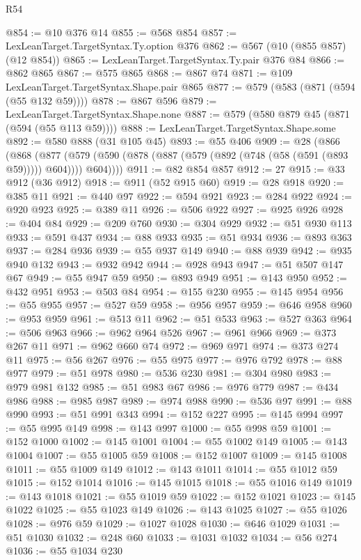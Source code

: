 \begin{lexlean}{R54}
\begin{coremodule}
@854 := @10 @376 @14
@855 := @568 @854
@857 := LexLeanTarget.TargetSyntax.Ty.option @376
@862 := @567 (@10 (@855 @857) (@12 @854))
@865 := LexLeanTarget.TargetSyntax.Ty.pair @376 @84
@866 := @862 @865
@867 := @575 @865
@868 := @867 @74
@871 := @109 LexLeanTarget.TargetSyntax.Shape.pair @865
@877 := @579 (@583 (@871 (@594 (@55 @132 @59))))
@878 := @867 @596
@879 := LexLeanTarget.TargetSyntax.Shape.none
@887 := @579 (@580 @879 @45 (@871 (@594 (@55 @113 @59))))
@888 := LexLeanTarget.TargetSyntax.Shape.some
@892 := @580 @888 (@31 @105 @45)
@893 := @55 @406
@909 := @28
    (@866
      (@868
        (@877 (@579 (@590 (@878 (@887 (@579 (@892 (@748 (@58 (@591 (@893 @59))))) @604)))) @604))))
@911 := @82 @854 @857
@912 := 27
@915 := @33 @912 (@36 @912)
@918 := @911 (@52 @915 @60)
@919 := @28 @918
@920 := @385 @11
@921 := @440 @97
@922 := @594 @921
@923 := @284 @922
@924 := @920 @923
@925 := @389 @11
@926 := @506 @922
@927 := @925 @926
@928 := @404 @84
@929 := @209 @760
@930 := @304 @929
@932 := @51 @930 @113
@933 := @591 @437
@934 := @88 @933
@935 := @51 @934
@936 := @893 @363
@937 := @284 @936
@939 := @55 @937 @149
@940 := @88 @939
@942 := @935 @940 @132
@943 := @932 @942
@944 := @928 @943
@947 := @51 @507 @147 @67
@949 := @55 @947 @59
@950 := @893 @949
@951 := @143 @950
@952 := @432 @951
@953 := @503 @84
@954 := @155 @230
@955 := @145 @954
@956 := @55 @955
@957 := @527 @59
@958 := @956 @957
@959 := @646 @958
@960 := @953 @959
@961 := @513 @11
@962 := @51 @533
@963 := @527 @363
@964 := @506 @963
@966 := @962 @964 @526
@967 := @961 @966
@969 := @373 @267 @11
@971 := @962 @660 @74
@972 := @969 @971
@974 := @373 @274 @11
@975 := @56 @267
@976 := @55 @975
@977 := @976 @792
@978 := @88 @977
@979 := @51 @978
@980 := @536 @230
@981 := @304 @980
@983 := @979 @981 @132
@985 := @51 @983 @67
@986 := @976 @779
@987 := @434 @986
@988 := @985 @987
@989 := @974 @988
@990 := @536 @97
@991 := @88 @990
@993 := @51 @991 @343
@994 := @152 @227
@995 := @145 @994
@997 := @55 @995 @149
@998 := @143 @997
@1000 := @55 @998 @59
@1001 := @152 @1000
@1002 := @145 @1001
@1004 := @55 @1002 @149
@1005 := @143 @1004
@1007 := @55 @1005 @59
@1008 := @152 @1007
@1009 := @145 @1008
@1011 := @55 @1009 @149
@1012 := @143 @1011
@1014 := @55 @1012 @59
@1015 := @152 @1014
@1016 := @145 @1015
@1018 := @55 @1016 @149
@1019 := @143 @1018
@1021 := @55 @1019 @59
@1022 := @152 @1021
@1023 := @145 @1022
@1025 := @55 @1023 @149
@1026 := @143 @1025
@1027 := @55 @1026
@1028 := @976 @59
@1029 := @1027 @1028
@1030 := @646 @1029
@1031 := @51 @1030
@1032 := @248 @60
@1033 := @1031 @1032
@1034 := @56 @274
@1036 := @55 @1034 @230

\end{coremodule}
\end{lexlean}
